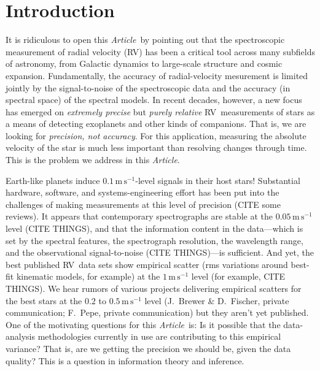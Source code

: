 \documentclass[modern]{aastex62}
\newcommand{\unit}[1]{\mathrm{#1}}
\newcommand{\m}{\unit{m}}
\newcommand{\s}{\unit{s}}
\newcommand{\mps}{\m\,\s^{-1}}
\newcommand{\documentname}{\textsl{Article}}
\newcommand{\acronym}[1]{{\small{#1}}}
\newcommand{\RV}{\acronym{RV}}
\begin{document}

\section{Introduction}

It is ridiculous to open this \documentname\ by pointing out that
the spectroscopic measurement of radial velocity (\RV) has been a
critical tool across many subfields of astronomy, from Galactic
dynamics to large-scale structure and cosmic expansion.
Fundamentally, the accuracy of radial-velocity mesurement is limited
jointly by the signal-to-noise of the spectroscopic data and
the accuracy (in spectral space) of the spectral models.
In recent decades, however, a new focus has emerged on \emph{extremely
  precise} but \emph{purely relative} \RV\ measurements of stars as a
means of detecting exoplanets and other kinds of companions.
That is, we are looking for \emph{precision, not accuracy}.
For this application, measuring the absolute velocity of the star is
much less important than resolving changes through time.
This is the problem we address in this \documentname.

Earth-like planets induce $0.1\,\mps$-level signals in their host
stars!
Substantial hardware, software, and systems-engineering effort has
been put into the challenges of making measurements at this level of
precision (CITE some reviews).
It appears that contemporary spectrographs are stable at the
$0.05\,\mps$ level (CITE THINGS), and that the information content in
the data---which is set by the spectral features, the spectrograph
resolution, the wavelength range, and the observational
signal-to-noise (CITE THINGS)---is sufficient.
And yet, the best published \RV\ data sets show empirical scatter
(rms variations around best-fit kinematic models, for example) at the
$1\,\mps$ level (for example, CITE THINGS).
We hear rumors of various projects delivering empirical scatters for
the best stars at the $0.2$ to $0.5\,\mps$ level
(J.~Brewer \& D.~Fischer, private communication; F.~Pepe, private communication)
but they aren't yet published.
One of the motivating questions for this \documentname\ is: Is it possible that
the data-analysis methodologies currently in use are contributing to this
empirical variance?
That is, are we getting the precision we should be, given the data
quality?
This is a question in information theory and inference.
\end{document}
